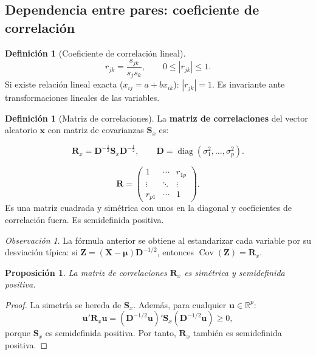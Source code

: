 \documentclass[12pt, a4paper]{article}
\theoremstyle{plain}
\newtheorem{proposicion}[teorema]{Proposición}
\theoremstyle{definition}
\newtheorem{definicion}[teorema]{Definición}
\theoremstyle{remark}
\newtheorem*{observacion}{Observación}
\newcommand{\R}{\mathbb{R}}
\newcommand{\mat}[1]{\mathbf{#1}}
\newcommand{\diag}{\operatorname{diag}}
\newcommand{\Cov}{\operatorname{Cov}}
\begin{document}
\subsection{Dependencia entre pares: coeficiente de correlación}

\begin{definicion}[Coeficiente de correlación lineal]
\[
  r_{jk} = \frac{s_{jk}}{s_j s_k}, \qquad 0\le|r_{jk}|\le1.
\]
Si existe relación lineal exacta ($x_{ij}=a+bx_{ik}$): $|r_{jk}|=1$. Es
invariante ante transformaciones lineales de las variables.
\end{definicion}

\begin{definicion}[Matriz de correlaciones]
La \textbf{matriz de correlaciones} del vector aleatorio $\mathbf{x}$ con
matriz de covarianzas $\mat{S}_x$ es:
\begin{mdframed}[style=resultado]
\[
  \mat{R}_x = \mat{D}^{-\frac{1}{2}}\mat{S}_x\mat{D}^{-\frac{1}{2}},
  \qquad \mat{D} = \diag(\sigma_1^2,\dots,\sigma_p^2).
\]
\end{mdframed}
\[
  \mat{R} = \begin{pmatrix}1&\cdots&r_{1p}\\\vdots&\ddots&\vdots\\r_{p1}&\cdots&1\end{pmatrix}.
\]
Es una matriz cuadrada y simétrica con unos en la diagonal y coeficientes de
correlación fuera. Es semidefinida positiva.
\end{definicion}

\begin{observacion}
La fórmula anterior se obtiene al estandarizar cada variable por su desviación
típica: si $\mathbf{Z}=(\mathbf{X}-\boldsymbol{\mu})\mat{D}^{-1/2}$, entonces
$\Cov(\mathbf{Z})=\mat{R}_x$.
\end{observacion}

\begin{proposicion}
La matriz de correlaciones $\mat{R}_x$ es simétrica y semidefinida positiva.
\end{proposicion}

\begin{proof}
La simetría se hereda de $\mat{S}_x$. Además, para cualquier
$\mathbf{u}\in\R^p$:
\[
  \mathbf{u}'\mat{R}_x\mathbf{u}
  = (\mat{D}^{-1/2}\mathbf{u})'\mat{S}_x(\mat{D}^{-1/2}\mathbf{u})\ge 0,
\]
porque $\mat{S}_x$ es semidefinida positiva. Por tanto, $\mat{R}_x$ también
es semidefinida positiva.
\end{proof}
\end{document}
